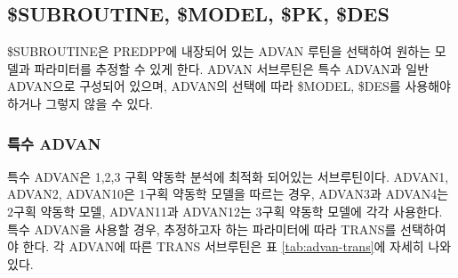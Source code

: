 \documentclass[
  11pt,
  krantz2,
  a4paper]{krantz}
\theoremstyle{definition}
\theoremstyle{definition}
\theoremstyle{definition}
\theoremstyle{remark}
\begin{document}
\hypertarget{subroutine-model-pk-des}{%
\subsection{\$SUBROUTINE, \$MODEL, \$PK, \$DES}\label{subroutine-model-pk-des}}


\$SUBROUTINE은 PREDPP에 내장되어 있는 ADVAN 루틴을 선택하여 원하는 모델과 파라미터를 추정할 수 있게 한다. ADVAN 서브루틴은 특수 ADVAN과 일반 ADVAN으로 구성되어 있으며, ADVAN의 선택에 따라 \$MODEL, \$DES를 사용해야 하거나 그렇지 않을 수 있다.

\hypertarget{uxd2b9uxc218-advan}{%
\subsubsection{특수 ADVAN}\label{uxd2b9uxc218-advan}}


특수 ADVAN은 1,2,3 구획 약동학 분석에 최적화 되어있는 서브루틴이다. ADVAN1, ADVAN2, ADVAN10은 1구획 약동학 모델을 따르는 경우, ADVAN3과 ADVAN4는 2구획 약동학 모델, ADVAN11과 ADVAN12는 3구획 약동학 모델에 각각 사용한다. 특수 ADVAN을 사용할 경우, 추정하고자 하는 파라미터에 따라 TRANS를 선택하여야 한다. 각 ADVAN에 따른 TRANS 서브루틴은 표 \ref{tab:advan-trans}에 자세히 나와있다.
\end{document}
